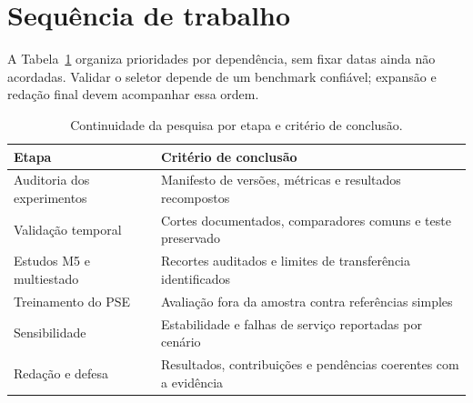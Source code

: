 \section{Sequência de trabalho}

A Tabela~\ref{tab:cronograma} organiza prioridades por dependência, sem fixar datas ainda não acordadas. Validar o seletor depende de um benchmark confiável; expansão e redação final devem acompanhar essa ordem.

\begin{table}[htbp]
\centering\small
\caption{Continuidade da pesquisa por etapa e critério de conclusão.}
\label{tab:cronograma}
\begin{tabular}{@{}p{4.1cm}p{8.9cm}@{}}
\toprule
Etapa & Critério de conclusão\\
\midrule
Auditoria dos experimentos & Manifesto de versões, métricas e resultados recompostos\\
Validação temporal & Cortes documentados, comparadores comuns e teste preservado\\
Estudos M5 e multiestado & Recortes auditados e limites de transferência identificados\\
Treinamento do PSE & Avaliação fora da amostra contra referências simples\\
Sensibilidade & Estabilidade e falhas de serviço reportadas por cenário\\
Redação e defesa & Resultados, contribuições e pendências coerentes com a evidência\\
\bottomrule
\end{tabular}
\end{table}
